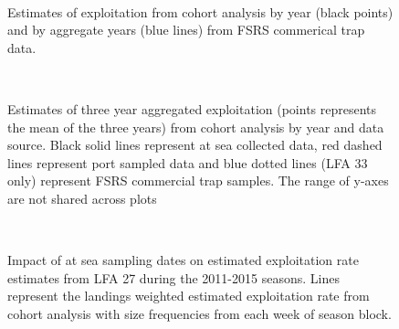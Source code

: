 \documentclass[11pt]{article}
\newcommand{\e}{/backup/bio_data/bio.lobster/figures/} %
\begin{document}
\begin{landscape}
\begin{figure}
        \centering
         \\
                     \caption{Estimates of exploitation from cohort analysis by year (black points) and by aggregate years (blue lines) from FSRS commerical trap data.}
        \end{figure}


\begin{figure}
        \centering
         \\
                    
                    \caption{Estimates of three year aggregated exploitation (points represents the mean of the three years) from cohort analysis by year and data source. Black solid lines represent at sea collected data, red dashed lines represent port sampled data and blue dotted lines (LFA 33 only) represent FSRS commercial trap samples. The range of y-axes are not shared across plots}
        \end{figure}


\begin{figure}
        \centering
         \\
                     \caption{Impact of at sea sampling dates on estimated exploitation rate estimates from LFA 27 during the 2011-2015 seasons. Lines represent the landings weighted estimated exploitation rate from cohort analysis with size frequencies from each week of season block.}
        \end{figure}



\end{landscape}
\end{document}
